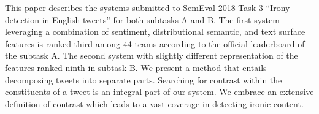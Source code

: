 This paper describes the systems submitted to SemEval 2018 Task 3 ``Irony detection in English tweets'' for both subtasks A and B. The first system leveraging a combination of sentiment, distributional semantic,  and text surface features is ranked third among 44 teams according to the official leaderboard of the subtask A. The second system with slightly different representation of the features ranked ninth in subtask B. We present a method that entails decomposing tweets into separate parts. Searching for contrast within the constituents of a tweet is an integral part of our system. We embrace an extensive definition of contrast which leads to a vast coverage in detecting ironic content.
